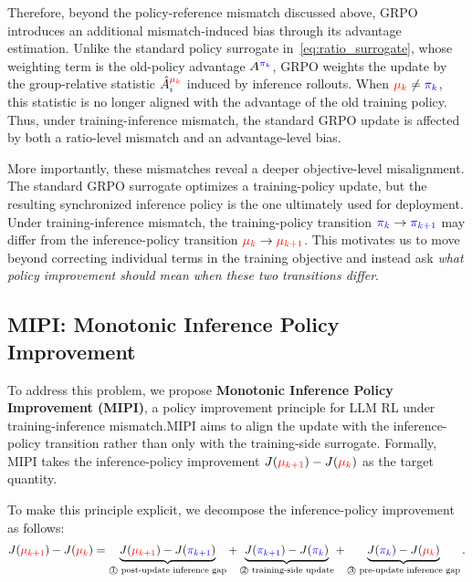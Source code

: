 Therefore, beyond the policy-reference mismatch discussed above, GRPO introduces an additional mismatch-induced bias through its advantage estimation.  
Unlike the standard policy surrogate in~\autoref{eq:ratio_surrogate}, whose weighting term is the old-policy advantage $A^{\textcolor{blue}{\pi_k}}$, GRPO weights the update by the group-relative statistic $\hat{A}^{\textcolor{red}{\mu_k}}_i$ induced by inference rollouts. 
When $\textcolor{red}{\mu_k}\neq\textcolor{blue}{\pi_k}$, this statistic is no longer aligned with the advantage of the old training policy. 
Thus, under training-inference mismatch, the standard GRPO update is affected by both a ratio-level mismatch and an advantage-level bias.

More importantly, these mismatches reveal a deeper objective-level misalignment.
The standard GRPO surrogate optimizes a training-policy update, but the resulting synchronized inference policy is the one ultimately used for deployment.
Under training-inference mismatch, the training-policy transition
$\textcolor{blue}{\pi_k}\rightarrow\textcolor{blue}{\pi_{k+1}}$
may differ from the inference-policy transition
$\textcolor{red}{\mu_k}\rightarrow\textcolor{red}{\mu_{k+1}}$.
This motivates us to move beyond correcting individual terms in the training objective and instead ask \textit{what policy improvement should mean when these two transitions differ}.


\subsection{MIPI: Monotonic Inference Policy Improvement}
\label{sec:mipi_objective}

To address this problem, we propose \textbf{Monotonic Inference Policy Improvement (MIPI)}, 
a policy improvement principle for LLM RL under training-inference mismatch.MIPI aims to align the update with the inference-policy transition rather than only with the training-side surrogate.
Formally, MIPI takes the inference-policy improvement
$J(\textcolor{red}{\mu_{k+1}})-J(\textcolor{red}{\mu_k})$
as the target quantity.


To make this principle explicit, we decompose the inference-policy improvement as follows:
\begin{equation}
\begin{aligned}
    J(\textcolor{red}{\mu_{k+1}}) - J(\textcolor{red}{\mu_k})
    =
    \underbrace{
        J(\textcolor{red}{\mu_{k+1}}) - J(\textcolor{blue}{\pi_{k+1}})
    }_{\text{\textcircled{1} post-update inference gap}}
    +
    \underbrace{
        J(\textcolor{blue}{\pi_{k+1}}) - J(\textcolor{blue}{\pi_k})
    }_{\text{\textcircled{2} training-side update}}
    +
    \underbrace{
        J(\textcolor{blue}{\pi_k}) - J(\textcolor{red}{\mu_k})
    }_{\text{\textcircled{3} pre-update inference gap}} .
\end{aligned}
\label{eq:deployed_improvement_decomposition}
\end{equation}



